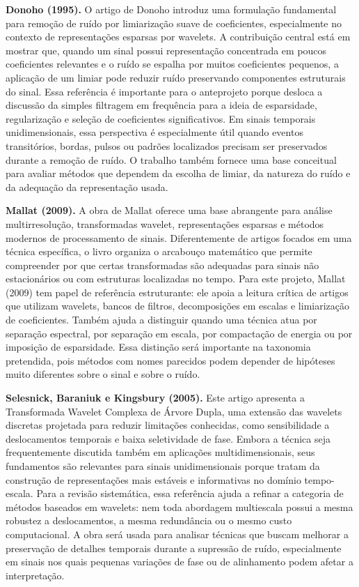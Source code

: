 \noindent\textbf{Donoho (1995).} O artigo de Donoho introduz uma formulação fundamental para remoção de ruído por limiarização suave de coeficientes, especialmente no contexto de representações esparsas por wavelets. A contribuição central está em mostrar que, quando um sinal possui representação concentrada em poucos coeficientes relevantes e o ruído se espalha por muitos coeficientes pequenos, a aplicação de um limiar pode reduzir ruído preservando componentes estruturais do sinal. Essa referência é importante para o anteprojeto porque desloca a discussão da simples filtragem em frequência para a ideia de esparsidade, regularização e seleção de coeficientes significativos. Em sinais temporais unidimensionais, essa perspectiva é especialmente útil quando eventos transitórios, bordas, pulsos ou padrões localizados precisam ser preservados durante a remoção de ruído. O trabalho também fornece uma base conceitual para avaliar métodos que dependem da escolha de limiar, da natureza do ruído e da adequação da representação usada.

\noindent\textbf{Mallat (2009).} A obra de Mallat oferece uma base abrangente para análise multirresolução, transformadas wavelet, representações esparsas e métodos modernos de processamento de sinais. Diferentemente de artigos focados em uma técnica específica, o livro organiza o arcabouço matemático que permite compreender por que certas transformadas são adequadas para sinais não estacionários ou com estruturas localizadas no tempo. Para este projeto, Mallat (2009) tem papel de referência estruturante: ele apoia a leitura crítica de artigos que utilizam wavelets, bancos de filtros, decomposições em escalas e limiarização de coeficientes. Também ajuda a distinguir quando uma técnica atua por separação espectral, por separação em escala, por compactação de energia ou por imposição de esparsidade. Essa distinção será importante na taxonomia pretendida, pois métodos com nomes parecidos podem depender de hipóteses muito diferentes sobre o sinal e sobre o ruído.

\noindent\textbf{Selesnick, Baraniuk e Kingsbury (2005).} Este artigo apresenta a Transformada Wavelet Complexa de Árvore Dupla, uma extensão das wavelets discretas projetada para reduzir limitações conhecidas, como sensibilidade a deslocamentos temporais e baixa seletividade de fase. Embora a técnica seja frequentemente discutida também em aplicações multidimensionais, seus fundamentos são relevantes para sinais unidimensionais porque tratam da construção de representações mais estáveis e informativas no domínio tempo-escala. Para a revisão sistemática, essa referência ajuda a refinar a categoria de métodos baseados em wavelets: nem toda abordagem multiescala possui a mesma robustez a deslocamentos, a mesma redundância ou o mesmo custo computacional. A obra será usada para analisar técnicas que buscam melhorar a preservação de detalhes temporais durante a supressão de ruído, especialmente em sinais nos quais pequenas variações de fase ou de alinhamento podem afetar a interpretação.

